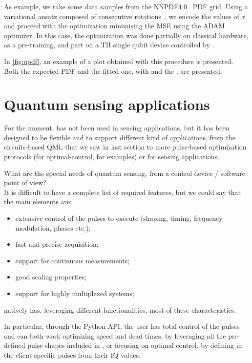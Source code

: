 As example, we take some data samples from the NNPDF4.0~\cite{Ball2022} PDF grid.
Using a variational ansatz composed of consecutive rotations~\cite{PrezSalinas2020}, we encode the values of $x$ and proceed with the optimization minimising the MSE using the ADAM~\cite{adam} optimizer.
In this case, the optimization was done partially on classical hardware,  as a pre-training, and part on a TII single qubit device controlled by \Qibosoq.

In \cref{fig:updf}, an example of a plot obtained with this procedure is presented.
Both the expected PDF and the fitted one, with \Qibosoq and the \RFSoC, are presented.


\section{Quantum sensing applications}
\label{sec:sens_application}

For the moment, \Qibosoq has not been used in sensing applications, but it has been designed to be flexible and to support different kind of applications, from the circuits-based QML that we saw in last section to more pulse-based optimization protocols (for optimal-control, for examples) or for sensing applications.

What are the special needs of quantum sensing, from a control device / software point of view?\\
It is difficult to have a complete list of required features, but we could say that the main elements are:
\begin{itemize}
    \item extensive control of the pulses to execute (shaping, timing, frequency modulation, phases etc.);
    \item fast and precise acquisition;
    \item support for continuous measurements;
    \item good scaling properties;
    \item support for highly multiplexed systems;
\end{itemize}

\Qibosoq natively has, leveraging different \Qick functionalities, most of these characteristics.

In particular, through the Python API, the user has total control of the pulses and can both work optimizing speed and dead times, by leveraging all the pre-defined pulse shapes included in \Qibosoq, or focusing on optimal control, by defining in the client specific pulses from their IQ values.

